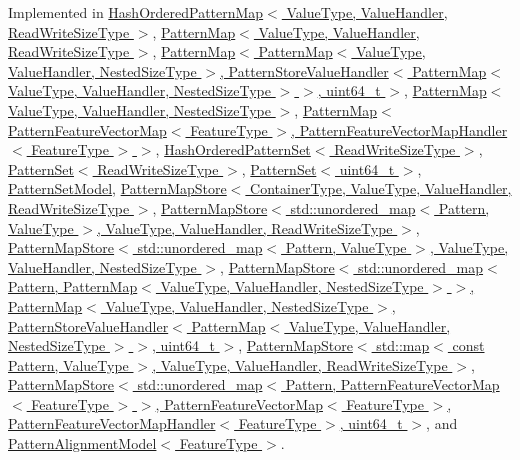 Implemented in \hyperlink{classHashOrderedPatternMap_ae2b83d2bcc1378b817044c205bd60651}{Hash\+Ordered\+Pattern\+Map$<$ Value\+Type, Value\+Handler, Read\+Write\+Size\+Type $>$}, \hyperlink{classPatternMap_a18587e4b3c6143749b4b96e8f4808cdb}{Pattern\+Map$<$ Value\+Type, Value\+Handler, Read\+Write\+Size\+Type $>$}, \hyperlink{classPatternMap_a18587e4b3c6143749b4b96e8f4808cdb}{Pattern\+Map$<$ Pattern\+Map$<$ Value\+Type, Value\+Handler, Nested\+Size\+Type $>$, Pattern\+Store\+Value\+Handler$<$ Pattern\+Map$<$ Value\+Type, Value\+Handler, Nested\+Size\+Type $>$ $>$, uint64\+\_\+t $>$}, \hyperlink{classPatternMap_a18587e4b3c6143749b4b96e8f4808cdb}{Pattern\+Map$<$ Value\+Type, Value\+Handler, Nested\+Size\+Type $>$}, \hyperlink{classPatternMap_a18587e4b3c6143749b4b96e8f4808cdb}{Pattern\+Map$<$ Pattern\+Feature\+Vector\+Map$<$ Feature\+Type $>$, Pattern\+Feature\+Vector\+Map\+Handler$<$ Feature\+Type $>$ $>$}, \hyperlink{classHashOrderedPatternSet_a4d917cedc8386b463aae0ad86856c82a}{Hash\+Ordered\+Pattern\+Set$<$ Read\+Write\+Size\+Type $>$}, \hyperlink{classPatternSet_a28de1eeb8ec5774505173cc28e06320e}{Pattern\+Set$<$ Read\+Write\+Size\+Type $>$}, \hyperlink{classPatternSet_a28de1eeb8ec5774505173cc28e06320e}{Pattern\+Set$<$ uint64\+\_\+t $>$}, \hyperlink{classPatternSetModel_a2fcd4d3d1023b5e20f67d2b845a29b2f}{Pattern\+Set\+Model}, \hyperlink{classPatternMapStore_a00d47f8640efaeb3ce85558b3ee4a6a2}{Pattern\+Map\+Store$<$ Container\+Type, Value\+Type, Value\+Handler, Read\+Write\+Size\+Type $>$}, \hyperlink{classPatternMapStore_a00d47f8640efaeb3ce85558b3ee4a6a2}{Pattern\+Map\+Store$<$ std\+::unordered\+\_\+map$<$ Pattern, Value\+Type $>$, Value\+Type, Value\+Handler, Read\+Write\+Size\+Type $>$}, \hyperlink{classPatternMapStore_a00d47f8640efaeb3ce85558b3ee4a6a2}{Pattern\+Map\+Store$<$ std\+::unordered\+\_\+map$<$ Pattern, Value\+Type $>$, Value\+Type, Value\+Handler, Nested\+Size\+Type $>$}, \hyperlink{classPatternMapStore_a00d47f8640efaeb3ce85558b3ee4a6a2}{Pattern\+Map\+Store$<$ std\+::unordered\+\_\+map$<$ Pattern, Pattern\+Map$<$ Value\+Type, Value\+Handler, Nested\+Size\+Type $>$ $>$, Pattern\+Map$<$ Value\+Type, Value\+Handler, Nested\+Size\+Type $>$, Pattern\+Store\+Value\+Handler$<$ Pattern\+Map$<$ Value\+Type, Value\+Handler, Nested\+Size\+Type $>$ $>$, uint64\+\_\+t $>$}, \hyperlink{classPatternMapStore_a00d47f8640efaeb3ce85558b3ee4a6a2}{Pattern\+Map\+Store$<$ std\+::map$<$ const Pattern, Value\+Type $>$, Value\+Type, Value\+Handler, Read\+Write\+Size\+Type $>$}, \hyperlink{classPatternMapStore_a00d47f8640efaeb3ce85558b3ee4a6a2}{Pattern\+Map\+Store$<$ std\+::unordered\+\_\+map$<$ Pattern, Pattern\+Feature\+Vector\+Map$<$ Feature\+Type $>$ $>$, Pattern\+Feature\+Vector\+Map$<$ Feature\+Type $>$, Pattern\+Feature\+Vector\+Map\+Handler$<$ Feature\+Type $>$, uint64\+\_\+t $>$}, and \hyperlink{classPatternAlignmentModel_ad81e599091c476a9cb121e7e04a4da5a}{Pattern\+Alignment\+Model$<$ Feature\+Type $>$}.


